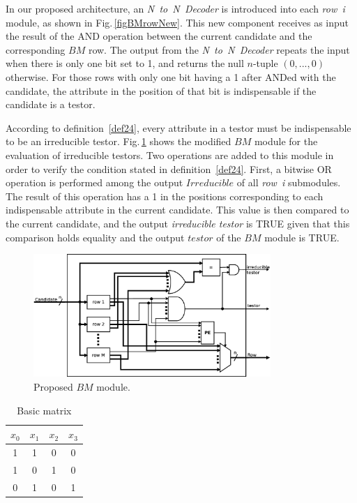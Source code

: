 \documentclass[conference]{IEEEtran}
\begin{document}
In our proposed architecture, an \textit{N~to~N~Decoder} is introduced into each 
\textit{row~i} module, as shown in Fig.\,\ref{figBMrowNew}. This new component receives as input 
the result of the AND operation between the current candidate and the corresponding $BM$ row.
The output from the \textit{N~to~N~Decoder} repeats the input when there is only one bit set
to 1, and returns the null $n$-tuple $(0,...,0)$ otherwise. For those rows with only one bit having a 1 after ANDed with the candidate, the attribute in the position of that bit is indispensable if the candidate is a testor.

According to definition~\ref{def24}, every attribute in a testor must be indispensable to be an
irreducible testor. Fig.\,\ref{figBMnew} shows the modified $BM$ module for the evaluation of 
irreducible testors. Two operations are added to this module in order to verify the condition stated in 
definition~\ref{def24}. First, a bitwise OR operation is performed among the output $Irreducible$ of all 
\textit{row~i} submodules. The result of this operation has a 1 in the positions corresponding to each 
indispensable attribute in the current candidate. This value is then compared to the current candidate, 
and the output \textit{irreducible testor} is TRUE given that this comparison holds equality and 
the output $testor$ of the $BM$ module is TRUE.

\begin{figure}[htb]
    \centering
	\includegraphics[width=9cm]{BM_module_new.eps}
	\caption{Proposed $BM$ module.}
	\label{figBMnew}
\end{figure}

\begin{table}[htb]
	\renewcommand{\arraystretch}{1.3}
	\caption{Basic matrix}
	\label{tabBM}
	\centering
	\begin{tabular}{cccc}
	 	\hline                       
	  	$x_0$ & $x_1$ & $x_2$ & $x_3$\\
	  	\hline
	  	1 & 1 & 0 & 0 \\
	  	1 & 0 & 1 & 0 \\
	  	0 & 1 & 0 & 1 \\
	 	\hline 
	\end{tabular}
\end{table}
\end{document}
